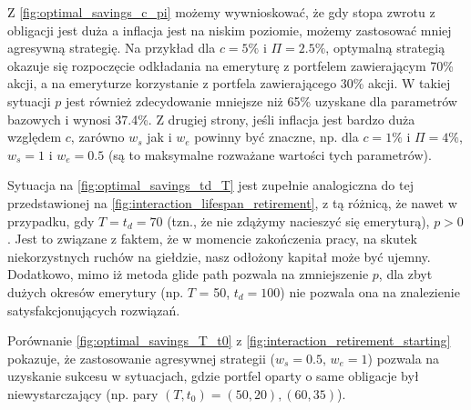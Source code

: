 \documentclass{article}
\begin{document}
Z \autoref{fig:optimal_savings_c_pi} możemy wywnioskować, że gdy stopa zwrotu z obligacji jest duża a inflacja jest na niskim poziomie, możemy zastosować mniej agresywną strategię.
Na przykład dla $c=5\%$ i $\Pi=2.5\%$, optymalną strategią okazuje się rozpoczęcie odkładania na emeryturę z portfelem zawierającym 70\% akcji, a na emeryturze korzystanie z portfela zawierającego 30\% akcji.
W takiej sytuacji $p$ jest również zdecydowanie mniejsze niż 65\% uzyskane dla parametrów bazowych i wynosi 37.4\%.
Z drugiej strony, jeśli inflacja jest bardzo duża względem $c$, zarówno $w_s$ jak i $w_e$ powinny być znaczne, np. dla $c=1\%$ i $\Pi = 4\%$, $w_s = 1$ i $w_e=0.5$ (są to maksymalne rozważane wartości tych parametrów).

Sytuacja na \autoref{fig:optimal_savings_td_T} jest zupełnie analogiczna do tej przedstawionej na \autoref{fig:interaction_lifespan_retirement}, z tą różnicą, że nawet w przypadku, gdy $T = t_d = 70$ (tzn., że nie zdążymy nacieszyć się emeryturą), $p > 0$.
Jest to związane z faktem, że w momencie zakończenia pracy, na skutek niekorzystnych ruchów na giełdzie, nasz odłożony kapitał może być ujemny.
Dodatkowo, mimo iż metoda glide path pozwala na zmniejszenie $p$, dla zbyt dużych okresów emerytury (np. $T$ = 50, $t_d = 100$) nie pozwala ona na znalezienie satysfakcjonujących rozwiązań.

Porównanie \autoref{fig:optimal_savings_T_t0} z \autoref{fig:interaction_retirement_starting} pokazuje, że zastosowanie agresywnej strategii ($w_s = 0.5$, $w_e = 1$) pozwala na uzyskanie sukcesu w sytuacjach, gdzie portfel oparty o same obligacje był niewystarczający (np. pary $(T, t_0) = (50, 20), (60, 35)$).
\end{document}
